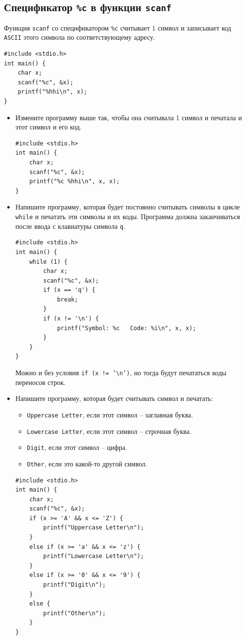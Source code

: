 \documentclass{article}
\begin{document}
\subsection*{Спецификатор \texttt{\%c} в функции \texttt{scanf}}
Функция \texttt{scanf} со спецификатором \texttt{\%c} считывает 1 символ и записывает код \texttt{ASCII} этого символа по соответствующему адресу.
\begin{lstlisting}
#include <stdio.h>
int main() {
    char x; 
    scanf("%c", &x);
    printf("%hhi\n", x);
}
\end{lstlisting}

\begin{itemize}
\item Измените программу выше так, чтобы она считывала 1 символ и печатала и этот символ и его код.
\begin{lstlisting}[backgroundcolor = \color{solcolor}]
#include <stdio.h>
int main() {
    char x; 
    scanf("%c", &x);
    printf("%c %hhi\n", x, x);
}
\end{lstlisting}
\item Напишите программу, которая будет постоянно считывать символы в цикле \texttt{while} и печатать эти символы и их коды. Программа должна заканчиваться после ввода с клавиатуры символа \texttt{q}.
\begin{lstlisting}[backgroundcolor = \color{solcolor}]
#include <stdio.h>
int main() {
    while (1) {
        char x; 
        scanf("%c", &x);
        if (x == 'q') {
            break;
        }
        if (x != '\n') {
            printf("Symbol: %c   Code: %i\n", x, x);
        }
    }
}
\end{lstlisting}
Можно и без условия \texttt{if (x != '\textbackslash n')}, но тогда будут печататься коды переносов строк.
\item Напишите программу, которая будет считывать символ и печатать:
\begin{itemize}
\item \texttt{Uppercase Letter}, если этот символ -- заглавная буква.
\item \texttt{Lowercase Letter}, если этот символ -- строчная буква.
\item \texttt{Digit}, если этот символ -- цифра.
\item \texttt{Other}, если это какой-то другой символ.
\end{itemize}
\begin{lstlisting}[backgroundcolor = \color{solcolor}]
#include <stdio.h>
int main() {
    char x; 
    scanf("%c", &x);
    if (x >= 'A' && x <= 'Z') {
        printf("Uppercase Letter\n");
    }
    else if (x >= 'a' && x <= 'z') {
        printf("Lowercase Letter\n");
    }
    else if (x >= '0' && x <= '9') {
        printf("Digit\n");
    }
    else {
        printf("Other\n");
    }
}
\end{lstlisting}
\end{itemize}
\end{document}
